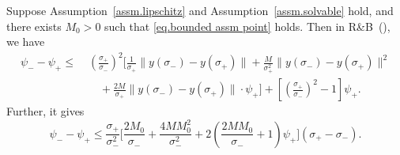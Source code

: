 \documentclass{article}
\begin{document}
\begin{lemma}
    \label{lem.bound gap bisection}
    Suppose Assumption~\ref{assm.lipschitz} and Assumption~\ref{assm.solvable} hold, and there exists $M_0>0$ such that \eqref{eq.bounded assm point} holds. Then in \textnormal{R\&B}~(), we have
    \begin{equation}\label{eq.bound gap bisection}
        \begin{aligned}
            \psi_- - \psi_+
            \leq\; & \left( \frac{\sigma_+}{\sigma_-} \right)^2 \Bigg[
                \frac{1}{\sigma_+} \|y(\sigma_-)-y(\sigma_+)\|
            + \frac{M}{\sigma_+^2} \|y(\sigma_-)-y(\sigma_+)\|^2                          \\
                   & \quad + \frac{2M}{\sigma_+} \|y(\sigma_-)-y(\sigma_+)\| \cdot \psi_+
                \Bigg]
            + \left[ \left( \frac{\sigma_+}{\sigma_-} \right)^2 - 1 \right] \psi_+.
        \end{aligned}
    \end{equation}
    Further, it gives
    \begin{equation}
        \label{eq.bounded gap bisection sigma}
        \psi_- - \psi_+
        \leq
        \frac{\sigma_+}{\sigma_-^2}
        \Bigg[
            \frac{2M_0}{\sigma_-}
            +
            \frac{4MM_0^2}{\sigma_-^2}
            +
            2\left(
            \frac{2MM_0}{\sigma_-}+1
            \right)\psi_+
            \Bigg]
        (\sigma_+-\sigma_-).
    \end{equation}
\end{lemma}
\end{document}
